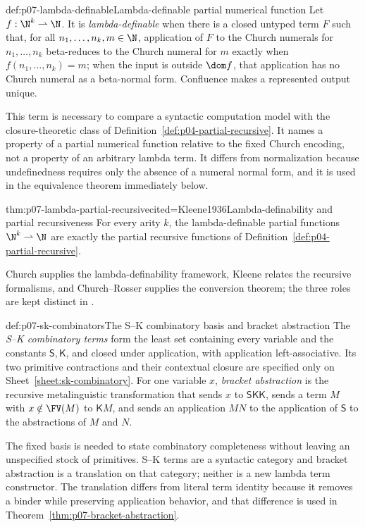 \begin{hbdefinition}{def:p07-lambda-definable}{Lambda-definable partial numerical function}
Let \(f:\N^k\rightharpoonup\N\).  It is \emph{lambda-definable} when there is
a closed untyped term \(F\) such that, for all \(n_1,\ldots,n_k,m\in\N\),
application of \(F\) to the Church numerals for \(n_1,\ldots,n_k\) beta-reduces
to the Church numeral for \(m\) exactly when
\(f(n_1,\ldots,n_k)=m\); when the input is outside \(\dom f\), that application
has no Church numeral as a beta-normal form.  Confluence makes a represented
output unique.

This term is necessary to compare a syntactic computation model with the
closure-theoretic class of Definition~\ref{def:p04-partial-recursive}.  It
names a property of a partial numerical function relative to the fixed Church
encoding, not a property of an arbitrary lambda term.  It differs from
normalization because undefinedness requires only the absence of a numeral
normal form, and it is used in the equivalence theorem immediately below.
\end{hbdefinition}

\begin{hbtheorem}{thm:p07-lambda-partial-recursive}{cited=Kleene1936}{Lambda-definability and partial recursiveness}
For every arity \(k\), the lambda-definable partial functions
\(\N^k\rightharpoonup\N\) are exactly the partial recursive functions of
Definition~\ref{def:p04-partial-recursive}.
\end{hbtheorem}

Church supplies the lambda-definability framework, Kleene relates the
recursive formalisms, and Church--Rosser supplies the conversion theorem; the
three roles are kept distinct in
\cite{Church1936,Kleene1936,ChurchRosser1936}.

\begin{hbdefinition}{def:p07-sk-combinators}{The S--K combinatory basis and bracket abstraction}
The \emph{S--K combinatory terms} form the least set containing every variable
and the constants \(\mathsf S,\mathsf K\), and closed under application, with
application left-associative.
Its two primitive contractions and their contextual closure are specified only
on Sheet~\ref{sheet:sk-combinatory}.
For one variable \(x\), \emph{bracket abstraction} is the recursive
metalinguistic transformation that sends \(x\) to
\(\mathsf S\mathsf K\mathsf K\), sends a term \(M\) with
\(x\notin\FV(M)\) to \(\mathsf K M\), and sends an application \(MN\) to the
application of \(\mathsf S\) to the abstractions of \(M\) and \(N\).

The fixed basis is needed to state combinatory completeness without leaving
an unspecified stock of primitives.  S--K terms are a syntactic category and
bracket abstraction is a translation on that category; neither is a new
lambda term constructor.  The translation differs from literal term identity
because it removes a binder while preserving application behavior, and that
difference is used in Theorem~\ref{thm:p07-bracket-abstraction}.
\end{hbdefinition}


